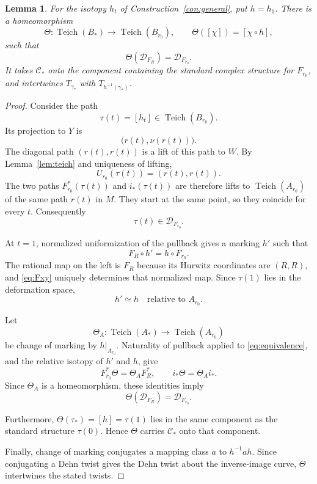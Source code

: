 \documentclass[11pt]{article}
\newcommand{\Teich}{\operatorname{Teich}}
\newcommand{\Def}{\mathcal D}
\newtheorem{lemma}[theorem]{Lemma}
\theoremstyle{definition}
\theoremstyle{remark}
\begin{document}
\begin{lemma}\label{lem:transport}
For the isotopy $h_t$ of Construction~\ref{con:general}, put $h=h_1$.
There is a homeomorphism
\[
\Theta:\Teich(B_*)\longrightarrow\Teich(B_{r_0}),
\qquad
\Theta([\chi])=[\chi\circ h],
\]
such that
\[
\Theta(\Def_{F_R})=\Def_{F_{r_0}}.
\]
It takes $\mathcal C_*$ onto the component containing the standard
complex structure for $F_{r_0}$, and intertwines $T_{\gamma_*}$ with
$T_{h^{-1}(\gamma_*)}$.
\end{lemma}

\begin{proof}
Consider the path
\[
\tau(t)=[h_t]\in\Teich(B_{r_0}).
\]
Its projection to $Y$ is
\[
\bigl(r(t),\nu(r(t))\bigr).
\]
The diagonal path $(r(t),r(t))$ is a lift of this path to $W$.
By Lemma~\ref{lem:teich} and uniqueness of lifting,
\[
U_{r_0}(\tau(t))=(r(t),r(t)).
\]
The two paths $F_{r_0}^*(\tau(t))$ and $i_*(\tau(t))$ are therefore
lifts to $\Teich(A_{r_0})$ of the same path $r(t)$ in $M$.
They start at the same point, so they coincide for every $t$.
Consequently
\[
\tau(t)\in\Def_{F_{r_0}}.
\]

At $t=1$, normalized uniformization of the pullback gives a marking
$h'$ such that
\begin{equation}\label{eq:equivalence}
F_R\circ h'=h\circ F_{r_0}.
\end{equation}
The rational map on the left is $F_R$ because its Hurwitz coordinates
are $(R,R)$, and \eqref{eq:Fxy} uniquely determines that normalized
map.  
Since $\tau(1)$ lies in the deformation space,
\[
h'\simeq h\quad\text{relative to }A_{r_0}.
\]

Let
\[
\Theta_A:\Teich(A_*)\longrightarrow\Teich(A_{r_0})
\]
be change of marking by $h|_{A_{r_0}}$.
Naturality of pullback applied to \eqref{eq:equivalence}, and the
relative isotopy of $h'$ and $h$, give
\[
F_{r_0}^*\Theta=\Theta_A F_R^*,
\qquad
i_*\Theta=\Theta_A i_*.
\]
Since $\Theta_A$ is a homeomorphism, these identities imply
\[
\Theta(\Def_{F_R})=\Def_{F_{r_0}}.
\]

Furthermore, $\Theta(\tau_*)=[h]=\tau(1)$ lies in the same component
as the standard structure $\tau(0)$.  Hence $\Theta$ carries
$\mathcal C_*$ onto that component.

Finally, change of marking conjugates a mapping class $a$ to
$h^{-1}ah$.  Since conjugating a Dehn twist gives the Dehn twist
about the inverse-image curve, $\Theta$ intertwines the stated
twists.
\end{proof}
\end{document}

